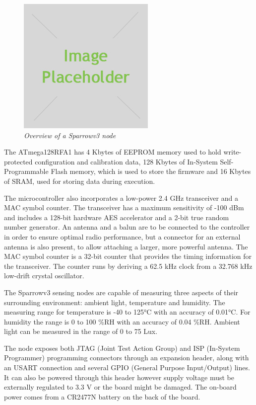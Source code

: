 \begin{figure}[ht]
	\begin{center}
		\includegraphics{img/placeholder.jpg}
	\end{center}
	\caption{\small \itshape{Overview of a Sparrowv3 node}}
\end{figure}

The \mbox{ATmega128RFA1} has 4 Kbytes of EEPROM memory used to hold
write-protected configuration and calibration data, 128 Kbytes of In-System
Self-Programmable Flash memory, which is used to store the firmware and 16
Kbytes of SRAM, used for storing data during execution.

The microcontroller also incorporates a low-power 2.4 GHz transceiver and a MAC
symbol counter. The transceiver has a maximum sensitivity of -100 dBm and
includes a 128-bit hardware AES accelerator and a 2-bit true random number
generator. An antenna and a balun are to be connected to the controller in order
to ensure optimal radio performance, but a connector for an external antenna is
also present, to allow attaching a larger, more powerful antenna. The MAC
symbol counter is a 32-bit counter that provides the timing information for the
transceiver. The counter runs by deriving a 62.5 kHz clock from a 32.768 kHz
low-drift crystal oscillator. 

The Sparrowv3 sensing nodes are capable of measuring three aspects of their
surrounding environment: ambient light, temperature and humidity. The measuring
range for temperature is -40 to 125°C with an accuracy of 0.01°C. For humidity
the range is 0 to 100 \%RH with an accuracy of 0.04 \%RH. Ambient light can be
measured in the range of 0 to 75 Lux.

The node exposes both JTAG (Joint Test Action Group) and ISP (In-System
Programmer) programming connectors through an expansion header, along with an
USART connection and several GPIO (General Purpose Input/Output) lines. It can
also be powered through this header however supply voltage must be externally
regulated to 3.3 V or the board might be damaged.  The on-board power comes
from a CR2477N battery on the back of the board.

